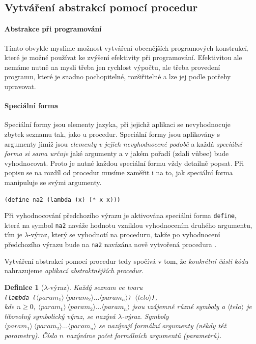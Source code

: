 \documentclass[10pt,a4paper]{article}
\newtheorem{definition}{Definice}
\begin{document}
  \subsection{Vytváření abstrakcí pomocí procedur}
    \paragraph{Abstrakce při programování} Tímto obvykle myslíme možnost vytváření obecnějších programových konstrukcí, které je možné používat ke zvýšení efektivity při programování. Efektivitou ale nemáme nutně na mysli třeba jen rychlost výpočtu, ale třeba provedení programu, které je snadno pochopitelné, rozšiřitelné a lze jej podle potřeby upravovat.
    
    \paragraph{Speciální forma} Speciální formy jsou elementy jazyka, při jejichž aplikaci se nevyhodnocuje zbytek seznamu tak, jako u procedur. Speciální formy jsou aplikovány s argumenty jimiž jsou \textit{elementy v jejich nevyhodnocené podobě} a každá \textit{speciální forma si sama určuje} jaké argumenty a v jakém pořadí (zdali vůbec) bude vyhodnocovat. Proto je nutné každou speciální formu vždy detailně popsat. Při popisu se na rozdíl od procedur musíme zaměřit i na to, jak speciální forma manipuluje se svými argumenty.
    
    \hspace{4ex} \texttt{(define na2 (lambda (x) (* x x)))}
    
    Při vyhodnocování předchozího výrazu je aktivována speciálni forma \texttt{define}, která na symbol \texttt{na2} naváže hodnotu vzniklou vyhodnocením druhého argumentu, tím je $\lambda$-výraz, který se vyhodnotí na proceduru, takže po vyhodnocení předchozího výrazu bude na \texttt{na2} navázána nově vytvořená procedura .
    
    Vytváření abstrakcí pomocí procedur tedy spočívá v tom, že \textit{konkrétní části kódu} nahrazujeme \textit{aplikací abstraktnějších procedur}.
    
    \begin{definition}[$\lambda$-výraz]
      Každý seznam ve tvaru\\
      \texttt{(lambda ($\langle param_1 \rangle\ \langle param_2 \rangle\ldots\langle param_n \rangle$) $\langle telo \rangle$)},\\
      kde $n\geq0$, $\langle param_1 \rangle\ \langle param_2 \rangle\ldots\langle param_n \rangle$ jsou vzájemně různé symboly a $\langle telo \rangle$ je libovolný symbolický výraz, se nazývá \textit{$\lambda$-výraz}. Symboly $\langle param_1 \rangle\ \langle param_2 \rangle\ldots\langle param_n \rangle$ se nazývají \textit{formální argumenty} (někdy též \textit{parametry}). Číslo $n$ nazýváme \textit{počet formálních argumentů} (\textit{parametrů}).
    \end{definition}
    
\end{document}
